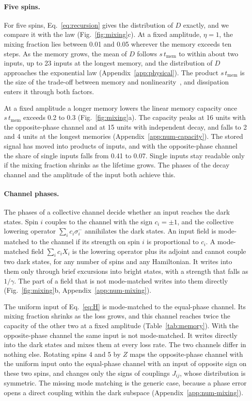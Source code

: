 \paragraph{Five spins.}
For five spins, Eq.~\eqref{eq:recursion} gives the distribution of $D$ exactly, and we compare it with the law
(Fig.~\ref{fig:mixing}c). At a fixed amplitude, $\eta=1$, the mixing fraction lies between 0.01 and 0.05 wherever
the memory exceeds ten steps. As the memory grows, the mean of $D$ follows $s\,t_{\mathrm{mem}}$ to within about two
inputs, up to 23 inputs at the longest memory, and the distribution of $D$ approaches the exponential law
(Appendix~\ref{app:physical}). The product $s\,t_{\mathrm{mem}}$ is the size of the trade-off between memory and
nonlinearity~\cite{Cindrak2026}, and dissipation enters it through both factors.

At a fixed amplitude a longer memory lowers the linear memory capacity once $s\,t_{\mathrm{mem}}$ exceeds 0.2 to 0.3
(Fig.~\ref{fig:mixing}a). The capacity peaks at 16 units with the opposite-phase channel and at 15 units with
independent decay, and falls to 2 and 4 units at the longest memories (Appendix~\ref{app:num-capacity}). The stored
signal has moved into products of inputs, and with the opposite-phase channel the share of single inputs falls from
0.41 to 0.07. Single inputs stay readable only if the mixing fraction shrinks as the lifetime grows. The phases of
the decay channel and the amplitude of the input both achieve this.

\paragraph{Channel phases.}
The phases of a collective channel decide whether an input reaches the dark states. Spin $i$ couples to the channel
with the sign $c_i=\pm1$, and the collective lowering operator $\sum_ic_i\sigma_i^-$ annihilates the dark states. An
input field is mode-matched to the channel if its strength on spin $i$ is proportional to $c_i$. A mode-matched field $\sum_ic_iX_i$ is the lowering operator plus
its adjoint and cannot couple two dark states, for any number of spins and any Hamiltonian. It writes into them only
through brief excursions into bright states, with a strength that falls as $1/\gamma$. The part of a field that is
not mode-matched writes into them directly (Fig.~\ref{fig:mixing}b, Appendix~\ref{app:num-mixing}).

The uniform input of Eq.~\eqref{eq:H} is mode-matched to the equal-phase channel. Its mixing fraction shrinks as the
loss grows, and this channel reaches twice the capacity of the other two at a fixed amplitude
(Table~\ref{tab:memory}). With the opposite-phase channel the same input is not mode-matched. It writes directly into
the dark states and mixes them at every loss rate. The two channels differ in nothing else. Rotating spins 4 and 5
by $Z$ maps the opposite-phase channel with the uniform input onto the equal-phase channel with an input of opposite
sign on these two spins, and changes only the signs of couplings $J_{ij}$, whose distribution is symmetric. The
missing mode matching is the generic case, because a phase error opens a direct coupling within the dark subspace
(Appendix~\ref{app:num-mixing}).

